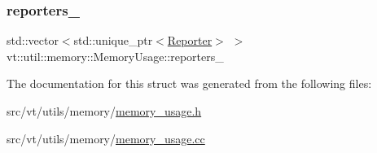 \mbox{\label{structvt_1_1util_1_1memory_1_1_memory_usage_afe2db27e57d4fb6f0356c06a376cd568}} 
\subsubsection{\texorpdfstring{reporters\+\_\+}{reporters\_}}
{\footnotesize\ttfamily std\+::vector$<$std\+::unique\+\_\+ptr$<$\hyperlink{structvt_1_1util_1_1memory_1_1_reporter}{Reporter}$>$ $>$ vt\+::util\+::memory\+::\+Memory\+Usage\+::reporters\+\_\+\hspace{0.3cm}{\ttfamily [private]}}



The documentation for this struct was generated from the following files\+:\begin{DoxyCompactItemize}
\item 
src/vt/utils/memory/\hyperlink{memory__usage_8h}{memory\+\_\+usage.\+h}\item 
src/vt/utils/memory/\hyperlink{memory__usage_8cc}{memory\+\_\+usage.\+cc}\end{DoxyCompactItemize}
